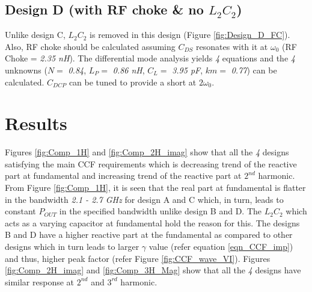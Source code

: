 \documentclass[conference]{IEEEtran}
\begin{document}
\subsection{Design D (with RF choke \& no $L_2C_2$)}
 Unlike design C, $L_2C_2$ is removed in this design (Figure \ref{fig:Design_D_FC}). Also, RF choke should be calculated assuming $C_{DS}$ resonates with it at $\omega_0$ (RF Choke = \textit{2.35 nH}).
The differential mode analysis yields \textit{4} equations and the \textit{4} unknowns ($N =$ \textit{0.84}, $L_P =$ \textit{0.86 nH}, $C_L =$ \textit{3.95 pF}, $km =$ \textit{0.77}) can be calculated.
$C_{DCP}$ can be tuned to provide a short at $2\omega_0$.

\section{Results}
\label{section:Results}

Figures \ref{fig:Comp_1H} and \ref{fig:Comp_2H_imag}  show that all the \textit{4} designs satisfying the main CCF requirements which is decreasing trend of the reactive part at fundamental and increasing trend of the reactive part at $2^{nd}$ harmonic.
From Figure \ref{fig:Comp_1H}, it is seen that the real part at fundamental is flatter in the bandwidth \textit{2.1 - 2.7 GHz} for design A and C which, in turn, leads to constant $P_{OUT}$ in the specified bandwidth unlike design B and D. The $L_2C_2$ which acts as a varying capacitor at fundamental hold the reason for this. The designs B and D have a higher reactive part at the fundamental as compared to other designs which in turn leads to larger $\gamma$ value (refer equation \ref{eqn_CCF_imp}) and thus, higher peak factor (refer Figure \ref{fig:CCF_wave_VI}). Figures \ref{fig:Comp_2H_imag} and \ref{fig:Comp_3H_Mag} show that all the \textit{4} designs have similar response at $2^{nd}$ and $3^{rd}$ harmonic. 
\end{document}
